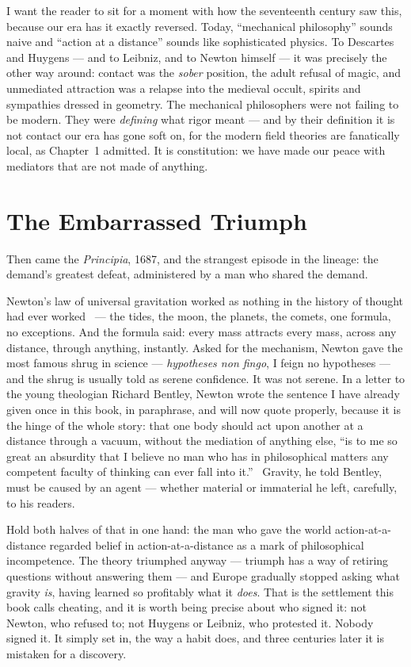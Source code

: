 \documentclass[fontsize=11pt,paper=a4,pagesize=auto,parskip=half-]{scrbook}
\begin{document}
I want the reader to sit for a moment with how the seventeenth century saw this, because our era has it exactly reversed. Today, ``mechanical philosophy'' sounds naive and ``action at a distance'' sounds like sophisticated physics. To Descartes and Huygens --- and to Leibniz, and to Newton himself --- it was precisely the other way around: contact was the \emph{sober} position, the adult refusal of magic, and unmediated attraction was a relapse into the medieval occult, spirits and sympathies dressed in geometry. The mechanical philosophers were not failing to be modern. They were \emph{defining} what rigor meant --- and by their definition it is not contact our era has gone soft on, for the modern field theories are fanatically local, as Chapter~1 admitted. It is constitution: we have made our peace with mediators that are not made of anything.

\section{The Embarrassed Triumph}

Then came the \emph{Principia}, 1687, and the strangest episode in the lineage: the demand's greatest defeat, administered by a man who shared the demand.

Newton's law of universal gravitation worked as nothing in the history of thought had ever worked~\cite{newton1687} --- the tides, the moon, the planets, the comets, one formula, no exceptions. And the formula said: every mass attracts every mass, across any distance, through anything, instantly. Asked for the mechanism, Newton gave the most famous shrug in science --- \emph{hypotheses non fingo}, I feign no hypotheses --- and the shrug is usually told as serene confidence. It was not serene. In a letter to the young theologian Richard Bentley, Newton wrote the sentence I have already given once in this book, in paraphrase, and will now quote properly, because it is the hinge of the whole story: that one body should act upon another at a distance through a vacuum, without the mediation of anything else, ``is to me so great an absurdity that I believe no man who has in philosophical matters any competent faculty of thinking can ever fall into it.''~\cite{janiak2014} Gravity, he told Bentley, must be caused by an agent --- whether material or immaterial he left, carefully, to his readers.

Hold both halves of that in one hand: the man who gave the world action-at-a-distance regarded belief in action-at-a-distance as a mark of philosophical incompetence. The theory triumphed anyway --- triumph has a way of retiring questions without answering them --- and Europe gradually stopped asking what gravity \emph{is}, having learned so profitably what it \emph{does}. That is the settlement this book calls cheating, and it is worth being precise about who signed it: not Newton, who refused to; not Huygens or Leibniz, who protested it. Nobody signed it. It simply set in, the way a habit does, and three centuries later it is mistaken for a discovery.
\end{document}
